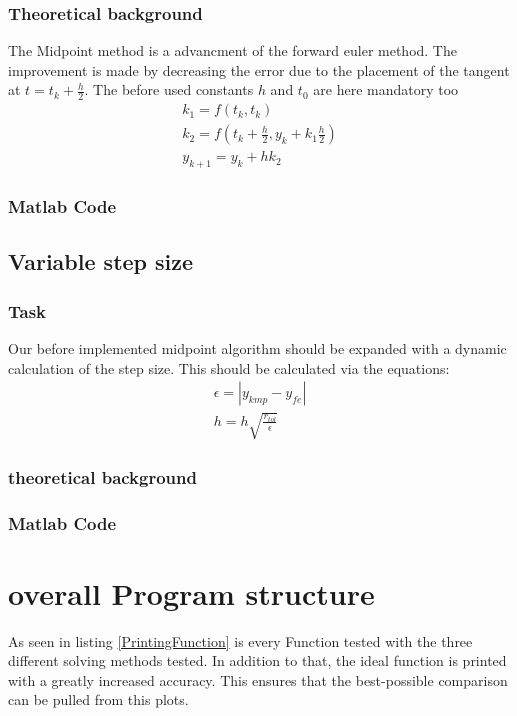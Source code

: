 \subsubsection{Theoretical background}
The Midpoint method is a advancment of the forward euler method. The improvement is made by decreasing the error due to the placement of the tangent at $t=t_k+\frac{h}{2}$. The before used constants $h$ and $t_0$ are here mandatory too
\begin{align}
    k_1=f(t_k,t_k)\\
    k_2=f(t_k+\frac{h}{2} , y_k+k_1\frac{h}{2})\\
    y_{k+1}=y_k+hk_2
\end{align}
\subsubsection{Matlab Code}


\subsection{Variable step size}
\subsubsection{Task}
Our before implemented midpoint algorithm should be expanded with a dynamic calculation of the step size. This should be calculated via the equations:
\begin{align}
    \epsilon = |y_{kmp}-y_{fe}| \\
    h=h\sqrt{\frac{r_{tol}}{\epsilon}}
\end{align}

\subsubsection{theoretical background}

\subsubsection{Matlab Code}

\section{overall Program structure}

As seen in listing \ref{PrintingFunction} is every Function tested with the three different solving methods tested. In addition to that, the ideal function is printed with a greatly increased accuracy. This ensures that the best-possible comparison can be pulled from this plots. 

